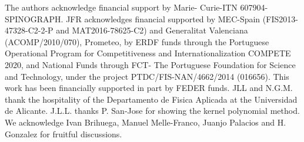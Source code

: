 \documentclass[aps,prb,twocolumn,superscriptaddress]{revtex4-1}
\begin{document}
The authors acknowledge financial support by Marie-
Curie-ITN 607904-SPINOGRAPH. JFR acknowledges financial  supported  by  MEC-Spain  (FIS2013-47328-C2-2-P  and  MAT2016-78625-C2)  and  Generalitat  Valenciana  (ACOMP/2010/070),  Prometeo,  by  ERDF  funds
through the Portuguese Operational Program for Competitiveness  and  Internationalization  COMPETE  2020,
and National Funds through FCT- The Portuguese Foundation  for  Science  and  Technology,  under  the  project
PTDC/FIS-NAN/4662/2014  (016656).   This  work  has
been financially supported in part by FEDER funds. JLL
and  N.G.M.  thank  the  hospitality  of  the  Departamento  de
Fisica Aplicada at the Universidad de Alicante.
J.L.L. thanks P. San-Jose for showing
the kernel polynomial method.
We acknowledge Ivan Brihuega, Manuel Melle-Franco, Juanjo Palacios and H. Gonzalez for fruitful discussions.

%


%
\end{document}
